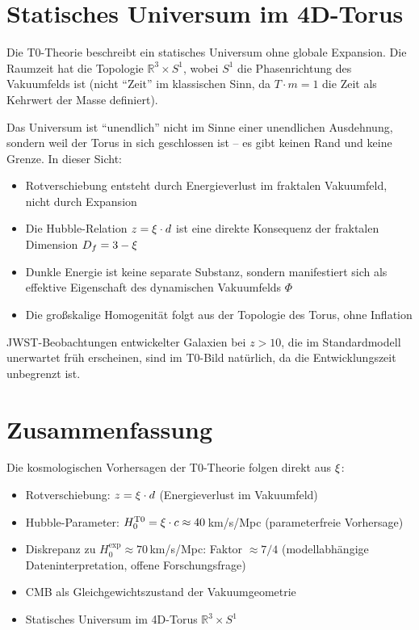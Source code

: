 \section{Statisches Universum im 4D-Torus}

Die T0-Theorie beschreibt ein statisches Universum ohne globale Expansion. 
Die Raumzeit hat die Topologie $\mathbb{R}^3 \times S^1$, wobei $S^1$ die 
Phasenrichtung des Vakuumfelds ist (nicht ``Zeit'' im klassischen Sinn, 
da $T \cdot m = 1$ die Zeit als Kehrwert der Masse definiert).

Das Universum ist ``unendlich'' nicht im Sinne einer unendlichen Ausdehnung, 
sondern weil der Torus in sich geschlossen ist -- es gibt keinen Rand und 
keine Grenze. In dieser Sicht:

\begin{itemize}
\item Rotverschiebung entsteht durch Energieverlust im fraktalen Vakuumfeld, 
nicht durch Expansion
\item Die Hubble-Relation $z = \xi \cdot d$ ist eine direkte Konsequenz 
der fraktalen Dimension $D_f = 3 - \xi$
\item Dunkle Energie ist keine separate Substanz, sondern manifestiert sich 
als effektive Eigenschaft des dynamischen Vakuumfelds $\Phi$
\item Die großskalige Homogenität folgt aus der Topologie des Torus, ohne 
Inflation
\end{itemize}

JWST-Beobachtungen entwickelter Galaxien bei $z > 10$, die im 
Standardmodell unerwartet früh erscheinen, sind im T0-Bild natürlich, da 
die Entwicklungszeit unbegrenzt ist.

\section{Zusammenfassung}

Die kosmologischen Vorhersagen der T0-Theorie folgen direkt aus $\xi$:

\begin{itemize}
\item Rotverschiebung: $z = \xi \cdot d$ (Energieverlust im Vakuumfeld)
\item Hubble-Parameter: $H_0^{\text{T0}} = \xi \cdot c \approx 40\,$km/s/Mpc 
(parameterfreie Vorhersage)
\item Diskrepanz zu $H_0^{\text{exp}} \approx 70\,$km/s/Mpc: Faktor $\approx 7/4$ 
(modellabhängige Dateninterpretation, offene Forschungsfrage)
\item CMB als Gleichgewichtszustand der Vakuumgeometrie
\item Statisches Universum im 4D-Torus $\mathbb{R}^3 \times S^1$
\end{itemize}

